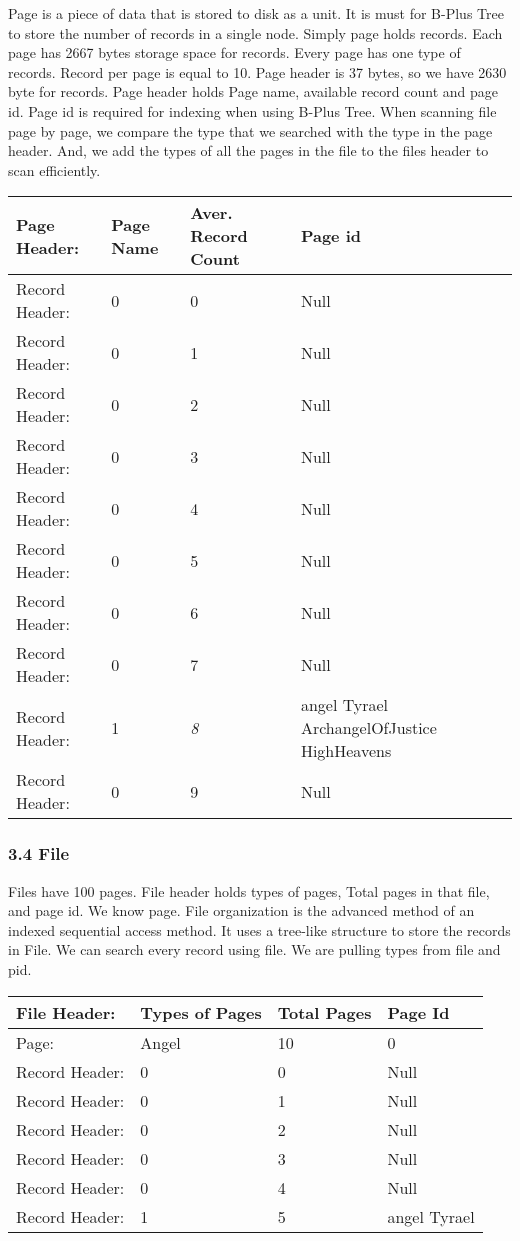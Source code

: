 \documentclass[
]{article}
\begin{document}
Page is a piece of data that is stored to disk as a unit. It is must for
B-Plus Tree to store the number of records in a single node. Simply page
holds records. Each page has 2667 bytes storage space for records. Every
page has one type of records. Record per page is equal to 10. Page
header is 37 bytes, so we have 2630 byte for records. Page header holds
Page name, available record count and page id. Page id is required for
indexing when using B-Plus Tree. When scanning file page by page, we
compare the type that we searched with the type in the page header. And,
we add the types of all the pages in the file to the files header to
scan efficiently.

\begin{longtable}[]{@{}llll@{}}
\toprule
Page Header: & Page Name & Aver. Record Count & Page id \\
\midrule
\endhead
Record Header: & 0 & 0 & Null \\
Record Header: & 0 & 1 & Null \\
Record Header: & 0 & 2 & Null \\
Record Header: & 0 & 3 & Null \\
Record Header: & 0 & 4 & Null \\
Record Header: & 0 & 5 & Null \\
Record Header: & 0 & 6 & Null \\
Record Header: & 0 & 7 & Null \\
Record Header: & 1 & \emph{8} & angel Tyrael ArchangelOfJustice
HighHeavens \\
Record Header: & 0 & 9 & Null \\
\bottomrule
\end{longtable}

\hypertarget{file}{%
\subsubsection{3.4 File}\label{file}}

Files have 100 pages. File header holds types of pages, Total pages in
that file, and page id. We know page. File organization is the advanced
method of an indexed sequential access method. It uses a tree-like
structure to store the records in File. We can search every record using
file. We are pulling types from file and pid.

\begin{longtable}[]{@{}llll@{}}
\toprule
File Header: & Types of Pages & Total Pages & Page Id \\
\midrule
\endhead
Page: & Angel & 10 & 0 \\
Record Header: & 0 & 0 & Null \\
Record Header: & 0 & 1 & Null \\
Record Header: & 0 & 2 & Null \\
Record Header: & 0 & 3 & Null \\
Record Header: & 0 & 4 & Null \\
Record Header: & 1 & 5 & angel Tyrael \\
\bottomrule
\end{longtable}
\end{document}
